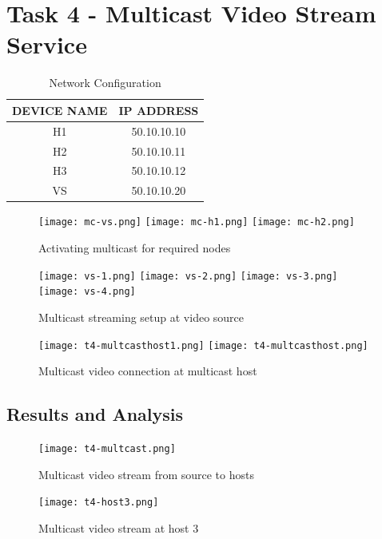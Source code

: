 \documentclass{article}
\begin{document}
\newpage
\section{Task 4 - Multicast Video Stream Service}
    	\begin{table}[h]
        		\centering
        		\begin{tabular}{|c|c|}
            		\hline
            		DEVICE NAME & IP ADDRESS \\
            		\hline
            		H1 & 50.10.10.10 \\
            		H2 & 50.10.10.11 \\
            		H3 & 50.10.10.12 \\
            		VS & 50.10.10.20 \\
            		\hline
        		\end{tabular}
        		\caption{Network Configuration}
        		\label{tab:5}
    	\end{table}
    	\begin{figure}[h]
        		\centering
        		\texttt{[image: mc-vs.png]}
        		\texttt{[image: mc-h1.png]}
        		\texttt{[image: mc-h2.png]}
        		\caption{Activating multicast for required nodes}
        		\label{fig:t4-1}
    	\end{figure}

\newpage
    	\begin{figure}[h]
		\centering
        		\texttt{[image: vs-1.png]}
        		\texttt{[image: vs-2.png]}
        		\texttt{[image: vs-3.png]}
        		\texttt{[image: vs-4.png]}
        		\caption{Multicast streaming setup at video source}
        		\label{fig:t4-2}
    	\end{figure}
	\begin{figure}[h]
		\centering
		\texttt{[image: t4-multcasthost1.png]}
		\texttt{[image: t4-multcasthost.png]}
		\caption{Multicast video connection at multicast host}
		\label{fig:t4-3}
	\end{figure}

\newpage
\subsection{Results and Analysis}
	\begin{figure}[h]
		\centering
		\texttt{[image: t4-multcast.png]}
		\caption{Multicast video stream from source to hosts}
		\label{fig:t4-4}
	\end{figure}
	\begin{figure}[h]
		\centering
		\texttt{[image: t4-host3.png]}
		\caption{Multicast video stream at host 3}
		\label{fig:t4-5}
	\end{figure}
\end{document}
